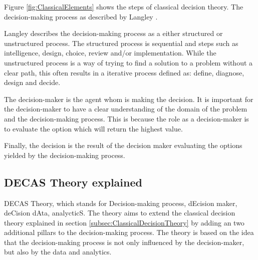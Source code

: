 Figure \ref{fig:ClassicalElements} shows the steps of classical decision theory. The decision-making process as described
by Langley \cite{Langley1995OpeningStool}. 

Langley describes the decision-making process as a either structured or unstructured process.
The structured process is sequential and steps such as intelligence, design, choice, review and/or implementation.
While the unstructured process is a way of trying to find a solution to a problem without a clear path, this
often results in a iterative process defined as: define, diagnose, design and decide.

The decision-maker is the agent whom is making the decision. It is important
for the decision-maker to have a clear understanding of the domain 
of the problem and the decision-making process. This is because the role as 
a decision-maker is to evaluate the option which will return the highest value.

Finally, the decision is the result of the decision maker evaluating the 
options yielded by the decision-making process. 

\subsection{DECAS Theory explained}

DECAS Theory, which stands for Decision-making process, dEcision maker, deCision dAta, analycticS. 
The theory aims to extend the classical decision theory explained in section
\ref{subsec:ClassicalDecisionTheory} by adding an two additional pillars to the 
decision-making process. The theory is based on the idea that the decision-making process
is not only influenced by the decision-maker, but also by the data and analytics.

